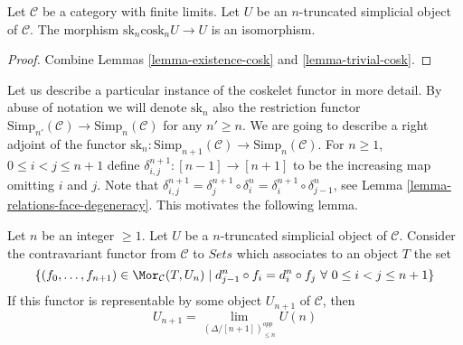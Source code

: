 \begin{lemma}
\label{lemma-recover-cosk}
Let $\mathcal{C}$ be a category with finite limits.
Let $U$ be an $n$-truncated simplicial object of $\mathcal{C}$.
The morphism $\text{sk}_n \text{cosk}_n U \to U$
is an isomorphism.
\end{lemma}

\begin{proof}
Combine Lemmas \ref{lemma-existence-cosk} and \ref{lemma-trivial-cosk}.
\end{proof}

\noindent
Let us describe a particular instance of the coskelet functor in more detail.
By abuse of notation we will denote $\text{sk}_n$
also the restriction functor
$\text{Simp}_{n'}(\mathcal{C}) \to \text{Simp}_n(\mathcal{C})$
for any $n' \geq n$. We are going to describe a right adjoint
of the functor
$\text{sk}_n : \text{Simp}_{n + 1}(\mathcal{C})
\to \text{Simp}_n(\mathcal{C})$.
For $n \geq 1$, $0 \leq i < j \leq n + 1$
define $\delta^{n + 1}_{i, j} : [n - 1] \to [n + 1]$
to be the increasing map omitting $i$ and $j$.
Note that
$\delta^{n + 1}_{i, j} =
\delta^{n + 1}_j \circ \delta^n_i =
\delta^{n + 1}_i \circ \delta^n_{j - 1}$, see
Lemma \ref{lemma-relations-face-degeneracy}. This motivates
the following lemma.

\begin{lemma}
\label{lemma-formula-limit}
Let $n$ be an integer $\geq 1$.
Let $U$ be a $n$-truncated simplicial object of $\mathcal{C}$.
Consider the contravariant functor from $\mathcal{C}$ to
$\textit{Sets}$ which associates to an object $T$ the set
$$
\{ (f_0, \ldots, f_{n + 1}) \in \Mor_\mathcal{C}(T, U_n)
\mid
d^n_{j - 1} \circ f_i = d^n_i \circ f_j
\ \forall\ 0\leq i < j\leq n + 1\}
$$
If this functor is representable by some object $U_{n + 1}$
of $\mathcal{C}$, then
$$
U_{n + 1} = \lim_{(\Delta/[n + 1])_{\leq n}^{opp}} U(n)
$$
\end{lemma}

